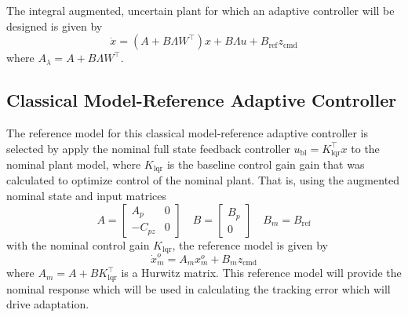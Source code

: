\documentclass[]{../sty/aiaa-tc}
\begin{document}
  The integral augmented, uncertain plant for which an adaptive controller will be designed is given by
  \begin{equation}
    \label{eqn:uncplant}
    \dot{x}=(A+B\Lambda W^{\top})x+B\Lambda u+B_{\text{ref}}z_{\text{cmd}}
  \end{equation}
  where $A_{\lambda}=A+B\Lambda W^{\top}$.

  \subsection{Classical Model-Reference Adaptive Controller}\label{sec:classicalmrac}

  The reference model for this classical model-reference adaptive controller is selected by apply the nominal full state feedback controller $u_{\text{bl}}=K_{\text{lqr}}^{\top}x$ to the nominal plant model, where $K_{\text{lqr}}$ is the baseline control gain gain that was calculated to optimize control of the nominal plant.
  That is, using the augmented nominal state and input matrices
  \begin{equation*}
    A=
    \begin{bmatrix}
      A_{p} & 0 \\
      -C_{pz} & 0
    \end{bmatrix}
    \quad
    B=
    \begin{bmatrix}
      B_{p} \\
      0
    \end{bmatrix}
    \quad
    B_{m}=B_{\text{ref}}
  \end{equation*}
  with the nominal control gain $K_{\text{lqr}}$, the reference model is given by
  \begin{equation}
    \label{eqn:xodotm}
    \dot{x}_{m}^{o}=A_{m}x_{m}^{o}+B_{m}z_{\text{cmd}}
  \end{equation}
  where $A_{m}=A+BK_{\text{lqr}}^{\top}$ is a Hurwitz matrix.
  This reference model will provide the nominal response which will be used in calculating the tracking error which will drive adaptation.
\end{document}
